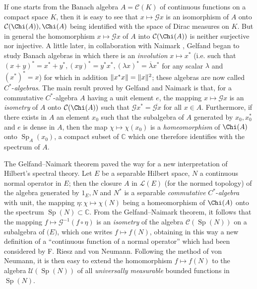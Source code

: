 \documentclass[12pt,a4paper,leqno,twoside]{extbook}
\DeclarePairedDelimiter{\norm}{\lVert}{\rVert}
\newcommand{\Cont}{\mathcal{C}}
\newcommand{\C}{\mathbb{C}}
\newcommand{\spec}{\operatorname{Sp}}
\begin{document}
If one starts from the Banach algebra \(A = \Cont(K)\) of continuous functions on a compact space \(K\), then it is easy to see that \(x \mapsto \mathcal{G}x\) is an isomorphism of \(A\) onto \(\Cont(\Chi(A)), \Chi(A)\) being identified with the space of Dirac measures on \(K\). But in general the homomorphism \(x \mapsto \mathcal{G}x\) of \(A\) into \(\Cont(\Chi(A))\) is neither surjective nor injective. A little later, in collaboration with Naimark \cite{085}, Gelfand began to study Banach algebras in which there is an \emph{involution} \(x \mapsto x^*\) (i.e. such that \((x+y)^* = x^* + y^*, (xy)^* = y^* x^*, (\lambda x)^* = \overline\lambda x^*\) for any scalar \(\lambda\) and \((x^*)^* = x\)) for which in addition \(\norm{x^* x} = \norm{x}^2\); these algebras are now called \(C^*\)-\emph{algebras}. The main result proved by Gelfand and Naimark is that, for a commutative \(C^*\)-algebra \(A\) having a unit element \(e\), the mapping \(x \mapsto \mathcal{G}x\) is an \emph{isometry} of \(A\) onto \(\Cont(\Chi(A))\) such that \(\mathcal{G}x^* = \overline{\mathcal{G}x}\) for all \(x \in A\). Furthermore, if there exists in \(A\) an element \(x_0\) such that the subalgebra of \(A\) generated by \(x_0, x^*_0\) and \(e\) is dense in \(A\), then the map \(\chi \mapsto \chi(x_0)\) is a \emph{homeomorphism} of \(\Chi(A)\) onto \(\spec_A(x_0)\), a compact subset of \(\C\) which one therefore identifies with the spectrum of \(A\).

The Gelfand--Naimark theorem paved the way for a new interpretation of Hilbert's spectral theory. Let \(E\) be a separable Hilbert space, \(N\) a continuous normal operator in \(E\); then the closure \(A\) in \(\mathcal{L}(E)\) (for the normed topology) of the algebra generated by \(1_E, N\) and \(N^*\) is a separable \emph{commutative} \(C^*\)-\emph{algebra} with unit, the mapping \(\eta: \chi \mapsto \chi(N)\) being a homeomorphism of \(\Chi(A)\) onto the spectrum \(\spec(N) \subset \C\). From the Gelfand--Naimark theorem, it follows that the mapping \(f \mapsto \mathcal{G}^{-1}(f \circ \eta)\) is an \emph{isometry} of the algebra \(\Cont(\spec(N))\) on a subalgebra of \(\mathcal(E)\), which one writes \(f \mapsto f(N)\), obtaining in this way a new definition of a ``continuous function of a normal operator'' which had been considered by F. Riesz and von Neumann. Following the method of von Neumann, it is then easy to extend the homomorphism \(f \mapsto f(N)\) to the algebra \(\mathcal{U}(\spec(N))\) of all \emph{universally measurable} bounded functions in \(\spec(N)\).
\end{document}
